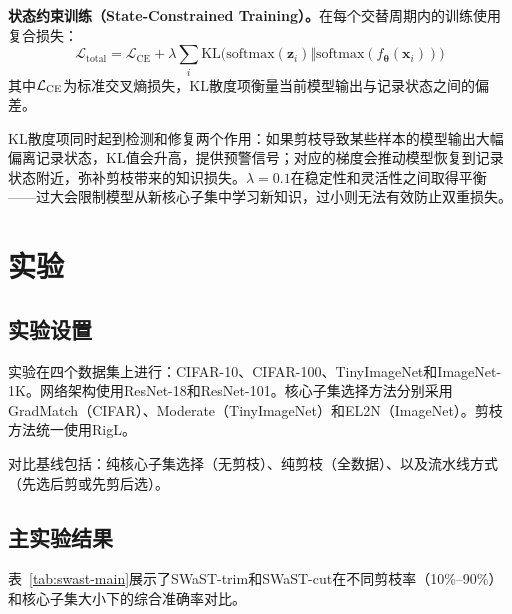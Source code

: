 \textbf{状态约束训练（State-Constrained Training）。}在每个交替周期内的训练使用复合损失：
\begin{equation}\label{eq:swast-loss}
  \mathcal{L}_{\text{total}} = \mathcal{L}_{\text{CE}} + \lambda \sum_{i} \mathrm{KL}\bigl(\mathrm{softmax}(\mathbf{z}_i) \Vert \mathrm{softmax}(f_{\symbf{\theta}}(\mathbf{x}_i))\bigr)
\end{equation}
其中$\mathcal{L}_{\text{CE}}$为标准交叉熵损失，KL散度项衡量当前模型输出与记录状态之间的偏差。

KL散度项同时起到检测和修复两个作用：如果剪枝导致某些样本的模型输出大幅偏离记录状态，KL值会升高，提供预警信号；对应的梯度会推动模型恢复到记录状态附近，弥补剪枝带来的知识损失。$\lambda = 0.1$在稳定性和灵活性之间取得平衡——过大会限制模型从新核心子集中学习新知识，过小则无法有效防止双重损失。%


\section{实验}

\subsection{实验设置}

实验在四个数据集上进行：CIFAR-10\cite{krizhevsky2009cifar}、CIFAR-100\cite{krizhevsky2009cifar}、TinyImageNet\cite{le2015tiny}和ImageNet-1K\cite{deng2009imagenet}。网络架构使用ResNet-18和ResNet-101\cite{he2016deep}。核心子集选择方法分别采用GradMatch\cite{killamsetty2021grad}（CIFAR）、Moderate\cite{xia2022moderate}（TinyImageNet）和EL2N\cite{paul2021deep}（ImageNet）。剪枝方法统一使用RigL\cite{evci2020rigging}。%

对比基线包括：纯核心子集选择（无剪枝）、纯剪枝（全数据）、以及流水线方式（先选后剪或先剪后选）。

\subsection{主实验结果}

表~\ref{tab:swast-main}展示了SWaST-trim和SWaST-cut在不同剪枝率（10\%--90\%）和核心子集大小下的综合准确率对比。

\begin{table}[htb]
  \centering
  \caption{SWaST-trim和SWaST-cut在不同剪枝率和coreset大小下的准确率对比}
  \label{tab:swast-main}
\end{table}

